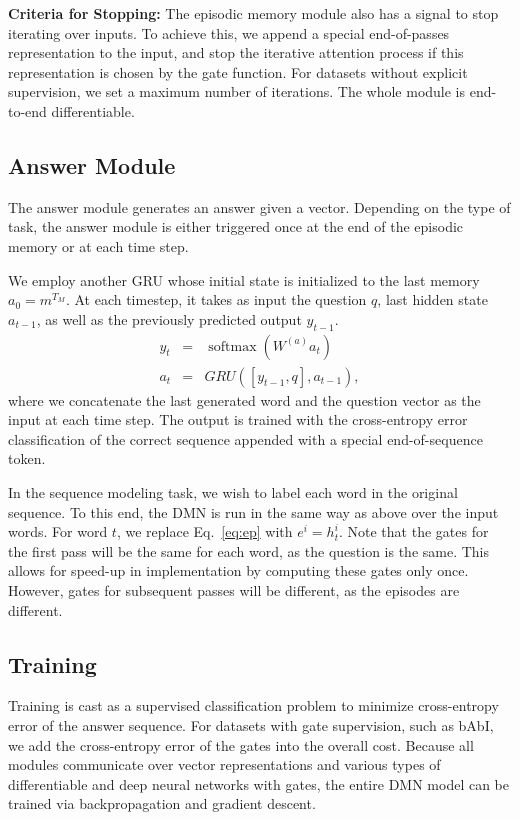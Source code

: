 \documentclass{article}
\DeclareMathOperator*{\softmax}{softmax}
\begin{document}
\textbf{Criteria for Stopping:} The episodic memory module also has a signal to stop iterating over inputs. To achieve this, we append a special end-of-passes representation to the input, and stop the iterative attention process if this representation is chosen by the gate function. For datasets without explicit supervision, we set a maximum number of iterations. The whole module is end-to-end differentiable.


\subsection{Answer Module}\label{section:answer}
The answer module generates an answer given a vector. Depending on the type of task, the answer module is either triggered once at the end of the episodic memory or at each time step.


We employ another GRU whose initial state is initialized to the last memory $a_0 = m^{T_M}$. At each timestep, it takes as input the question $q$, last hidden state $a_{t-1}$, as well as the previously predicted output $y_{t-1}$. 
\begin{eqnarray}
y_t &=& \softmax(W^{(a)} a_t)\\
a_t &=& GRU([y_{t-1},q],a_{t-1}),
\end{eqnarray}
where we concatenate the last generated word and the question vector as the input at each time step.
The output is trained with the cross-entropy error classification of the correct sequence appended with a special end-of-sequence token. 

In the sequence modeling task, we wish to label each word in the original sequence. To this end, the DMN is run in the same way as above over the input words. For word $t$, we replace Eq.~\ref{eq:ep} with $e^i = h^i_t$. Note that the gates for the first pass will be the same for each word, as the question is the same. This allows for speed-up in implementation by computing these gates only once. However, gates for subsequent passes will be different, as the episodes are different.


\subsection{Training}
Training is cast as a supervised classification problem to minimize cross-entropy error of the answer sequence. For datasets with gate supervision, such as bAbI, we add the cross-entropy error of the gates into the overall cost.
Because all modules communicate over vector representations and various types of differentiable and deep neural networks with gates, the entire DMN model can be trained via backpropagation and gradient descent.
\end{document}
